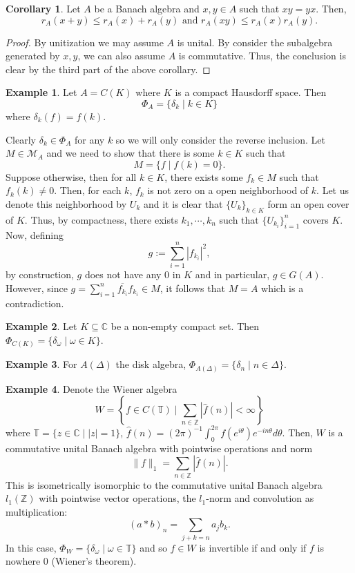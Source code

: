 \documentclass[]{article}
\theoremstyle{definition}
\newtheorem{corollary}{Corollary}[theorem]
\newtheorem{example}{Example}[section]
\begin{document}
\begin{corollary}
  Let \(A\) be a Banach algebra and \(x, y \in A\) such that \(xy = yx\). Then, 
  \[r_A(x + y) \le r_A(x) + r_A(y) \text{ and } r_A(xy) \le r_A(x) r_A(y).\]
\end{corollary}
\begin{proof}
  By unitization we may assume \(A\) is unital. By consider the subalgebra generated by \(x, y\), 
  we can also assume \(A\) is commutative. Thus, the conclusion is clear by the third part of the above corollary.
\end{proof}

\begin{example}
  Let \(A = C(K)\) where \(K\) is a compact Hausdorff space. Then 
  \[\Phi_A = \{\delta_k \mid k \in K\}\]
  where \(\delta_k(f) = f(k)\).

  Clearly \(\delta_k \in \Phi_A\) for any \(k\) so we will only consider the reverse inclusion.
  Let \(M \in \mathcal{M}_A\) and we need to show that there is some \(k \in K\) such that 
  \[M = \{f \mid f(k) = 0\}.\]
  Suppose otherwise, then for all \(k \in K\), there exists some \(f_k \in M\) such that 
  \(f_k(k) \ne 0\). Then, for each \(k\), \(f_k\) is not zero on a open neighborhood of \(k\). Let 
  us denote this neighborhood by \(U_k\) and it is clear that \(\{U_k\}_{k \in K}\) form an open 
  cover of \(K\). Thus, by compactness, there exists \(k_1, \cdots, k_n\) such that 
  \(\{U_{k_i}\}_{i = 1}^n\) covers \(K\). Now, defining 
  \[g := \sum_{i = 1}^n |f_{k_i}|^2,\]
  by construction, \(g\) does not have any 0 in \(K\) and in particular, \(g \in G(A)\). However, 
  since \(g = \sum_{i = 1}^n \overline{f_{k_i}} f_{k_i} \in M\), it follows that \(M = A\) which is 
  a contradiction.
\end{example}

\begin{example}
  Let \(K \subseteq \mathbb{C}\) be a non-empty compact set. Then \(\Phi_{C(K)} = \{\delta_\omega \mid \omega \in K\}\).
\end{example}

\begin{example}
  For \(A(\Delta)\) the disk algebra, \(\Phi_{A(\Delta)} = \{\delta_n \mid n \in \Delta\}\).
\end{example}

\begin{example}
  Denote the Wiener algebra 
  \[W = \left\{f \in C(\mathbb{T}) \mid \sum_{n \in \mathbb{Z}} |\hat{f}(n)| < \infty\right\}\]
  where \(\mathbb{T} = \{z \in \mathbb{C} \mid |z| = 1\}\), 
  \(\hat{f}(n) = (2\pi)^{-1}\int_0^{2\pi} f(e^{i\theta}) e^{-in\theta} d\theta\). Then, \(W\) is a commutative 
  unital Banach algebra with pointwise operations and norm 
  \[\|f\|_1 = \sum_{n \in \mathbb{Z}} |\hat{f}(n)|.\]
  This is isometrically isomorphic to the commutative unital Banach algebra \(l_1(\mathbb{Z})\) with 
  pointwise vector operations, the \(l_1\)-norm and convolution as multiplication: 
  \[(a * b)_n = \sum_{j + k = n} a_j b_k.\]
  In this case, \(\Phi_W  = \{\delta_\omega \mid \omega \in \mathbb{T}\}\) and so \(f \in W\) is 
  invertible if and only if \(f\) is nowhere 0 (Wiener's theorem). 
\end{example}
\end{document}
